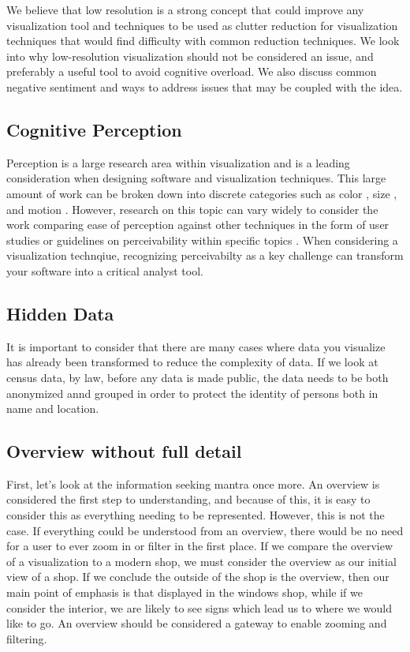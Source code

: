 We believe that low resolution is a strong concept that could improve any visualization tool and techniques to be used as clutter reduction for visualization techniques that would find difficulty with common reduction techniques.  We look into why low-resolution visualization should not be considered an issue, and preferably a useful tool to avoid cognitive overload. We also discuss common negative sentiment and ways to address issues that may be coupled with the idea.

\subsection{Cognitive Perception}
Perception is a large research area within visualization and is a leading consideration when designing software and visualization techniques. This large amount of work can be broken down into discrete categories such as color \cite{lee2013perceptually,heer2012color,szafir2018modeling}, size \cite{mcnabb2018when,borgo2014order,gramazio2014relation}, and motion \cite{simons2000current, driver1992motion, huber2005visualizing}. However, research on this topic can vary widely to consider the work comparing ease of perception against other techniques in the form of user studies \cite{rittschof1998learning} or guidelines on perceivability within specific topics \cite{kong2010perceptual}. When considering a visualization technqiue, recognizing perceivabilty as a key challenge can transform your software into a critical analyst tool.
\subsection{Hidden Data}
It is important to consider that there are many cases where data you visualize has already been transformed to reduce the complexity of data. If we look at census data, by law, before any data is made public, the data needs to be both anonymized annd grouped in order to protect the identity of persons both in name and location.
\subsection{Overview without full detail}
First, let's look at the information seeking mantra once more. An overview is considered the first step to understanding, and because of this, it is easy to consider this as everything needing to be represented. However, this is not the case. If everything could be understood from an overview, there would be no need for a user to ever zoom in or filter in the first place. If we compare the overview of a visualization to a modern shop, we must consider the overview as our initial view of a shop. If we conclude the outside of the shop is the overview, then our main point of emphasis is that displayed in the windows shop, while if we consider the interior, we are likely to see signs which lead us to where we would like to go. An overview should be considered a gateway to enable zooming and filtering.

